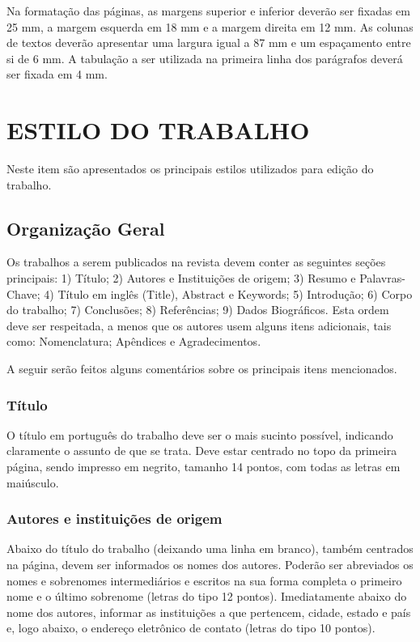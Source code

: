 \documentclass[portugues]{sobraep}
\begin{document}
Na formatação das páginas, as margens superior e inferior deverão ser fixadas em 25 mm, a margem esquerda em 18 mm e a margem direita em 12 mm. As colunas de textos deverão apresentar uma largura igual a 87 mm e um espaçamento entre si de 6 mm. A tabulação a ser utilizada na primeira linha dos parágrafos deverá ser fixada em 4 mm.

\section{ESTILO DO TRABALHO}

Neste item são apresentados os principais estilos utilizados para edição do trabalho.

\subsection{Organização Geral}

Os trabalhos a serem publicados na revista devem conter as seguintes seções principais: 1) Título; 2) Autores e Instituições de origem; 3) Resumo e Palavras-Chave; 4) Título em inglês (Title), Abstract e Keywords; 5) Introdução; 6) Corpo do trabalho; 7) Conclusões; 8) Referências; 9) Dados Biográficos. Esta ordem deve ser respeitada, a menos que os autores usem alguns itens adicionais, tais como: Nomenclatura; Apêndices e Agradecimentos.

A seguir serão feitos alguns comentários sobre os principais itens mencionados.

\subsubsection{Título}
O título em português do trabalho deve ser o mais sucinto possível, indicando claramente o assunto de que se trata. Deve estar centrado no topo da primeira página, sendo impresso em negrito, tamanho 14 pontos, com todas as letras em maiúsculo.

\subsubsection{Autores e instituições de origem}
Abaixo do título do trabalho (deixando uma linha em branco), também centrados na página, devem ser informados os nomes dos autores. Poderão ser abreviados os nomes e sobrenomes intermediários e escritos na sua forma completa o primeiro nome e o último sobrenome (letras do tipo 12 pontos). Imediatamente abaixo do nome dos autores, informar as instituições a que pertencem, cidade, estado e país e, logo abaixo, o endereço eletrônico de contato (letras do tipo 10 pontos).
\end{document}
